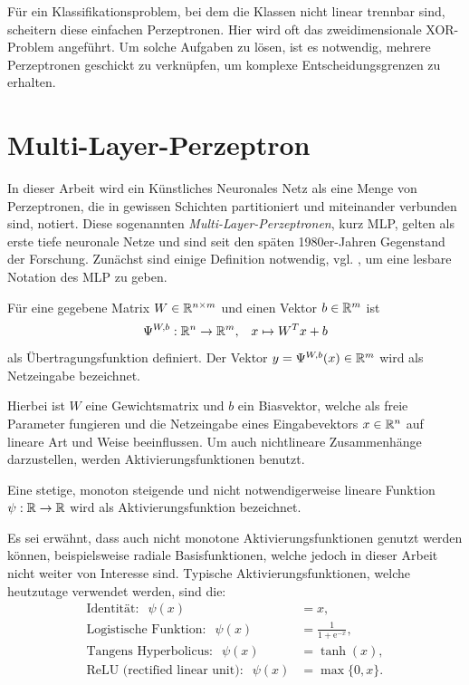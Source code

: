 Für ein Klassifikationsproblem, bei dem die Klassen nicht linear trennbar sind, scheitern diese einfachen Perzeptronen. Hier wird oft das zweidimensionale XOR-Problem angeführt. Um solche Aufgaben zu lösen, ist es notwendig, mehrere Perzeptronen geschickt zu verknüpfen, um komplexe Entscheidungsgrenzen zu erhalten.

\section{Multi-Layer-Perzeptron}
\label{MLP_abs}
In dieser Arbeit wird ein Künstliches Neuronales Netz als eine Menge von Perzeptronen, die in gewissen Schichten partitioniert und miteinander verbunden sind, notiert. Diese sogenannten \textit{Multi-Layer-Perzeptronen}, kurz MLP,  gelten als erste tiefe neuronale Netze und sind seit den späten 1980er-Jahren Gegenstand der Forschung\cite{bourlard1990links,bounds1988multilayer,MLPbook}. Zunächst sind einige Definition notwendig, vgl. \cite{gruening}, um eine lesbare Notation des MLP zu geben.

\begin{defi}[Übertragungsfunktion]
    \label{def_net}
    Für eine gegebene Matrix $W \in \mathbb{R}^{n \times m}$ und einen Vektor $b \in \mathbb{R}^m$ ist 
    \[ 
    \Psi^{W,b}: \mathbb{R}^n \rightarrow \mathbb{R}^m, \; \; \; x \mapsto W^T x +b
    \]
    als Übertragungsfunktion definiert. Der Vektor $y=\Psi^{W,b}(x) \in \mathbb{R}^m $ wird als Netzeingabe bezeichnet.
\end{defi}
Hierbei ist $W$ eine Gewichtsmatrix und $b$ ein Biasvektor, welche als freie Parameter fungieren und die Netzeingabe eines Eingabevektors $x \in \mathbb{R}^n$ auf lineare Art und Weise beeinflussen. Um auch nichtlineare Zusammenhänge darzustellen, werden Aktivierungsfunktionen benutzt.

\begin{defi}[Aktivierungsfunktion]
    \label{def_act_f}
    Eine stetige, monoton steigende und nicht notwendigerweise lineare Funktion $\psi: \mathbb{R} \rightarrow \mathbb{R}$ wird als Aktivierungsfunktion bezeichnet.
\end{defi}
Es sei erwähnt, dass auch nicht monotone Aktivierungsfunktionen genutzt werden können, beispielsweise radiale Basisfunktionen\cite{radialbasis}, welche jedoch in dieser Arbeit nicht weiter von Interesse sind.
Typische Aktivierungsfunktionen, welche heutzutage verwendet werden, sind die:
\begin{align*}
    \text{Identität}: \; \;\psi(x)&=x, \\
    \text{Logistische Funktion}: \; \;\psi(x)&=\frac{1}{1+\mathrm{e}^{-x}}, \\
    \text{Tangens Hyperbolicus}: \; \;\psi(x)&=\tanh(x), \\
    \text{ReLU (rectified linear unit)}: \; \;\psi(x)&=\max\{0,x\}.
\end{align*}

